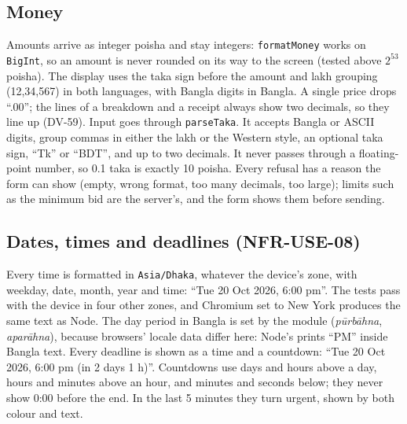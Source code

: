 \documentclass[11pt,a4paper]{article}
\begin{document}
\subsection{Money}
\label{sec:money}
Amounts arrive as integer poisha and stay integers: \texttt{formatMoney} works on \texttt{BigInt}, so an amount is never rounded on its way to the screen (tested above $2^{53}$ poisha). The display uses the taka sign before the amount and lakh grouping (12,34,567) in both languages, with Bangla digits in Bangla. A single price drops ``.00''; the lines of a breakdown and a receipt always show two decimals, so they line up (DV-59). Input goes through \texttt{parseTaka}. It accepts Bangla or ASCII digits, group commas in either the lakh or the Western style, an optional taka sign, ``Tk'' or ``BDT'', and up to two decimals. It never passes through a floating-point number, so 0.1 taka is exactly 10 poisha. Every refusal has a reason the form can show (empty, wrong format, too many decimals, too large); limits such as the minimum bid are the server's, and the form shows them before sending.

\subsection{Dates, times and deadlines (NFR-USE-08)}
Every time is formatted in \texttt{Asia/Dhaka}, whatever the device's zone, with weekday, date, month, year and time: ``Tue 20 Oct 2026, 6:00 pm''. The tests pass with the device in four other zones, and Chromium set to New York produces the same text as Node. The day period in Bangla is set by the module (\emph{p\=urb\=ahna}, \emph{apar\=ahna}), because browsers' locale data differ here: Node's prints ``PM'' inside Bangla text. Every deadline is shown as a time and a countdown: ``Tue 20 Oct 2026, 6:00 pm (in 2 days 1 h)''. Countdowns use days and hours above a day, hours and minutes above an hour, and minutes and seconds below; they never show 0:00 before the end. In the last 5 minutes they turn urgent, shown by both colour and text.
\end{document}
